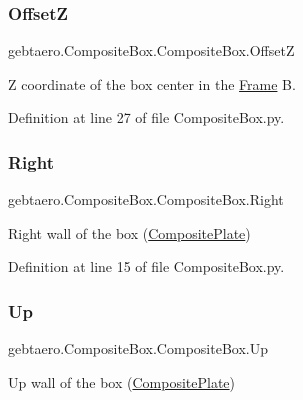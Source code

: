 \subsubsection{\texorpdfstring{OffsetZ}{OffsetZ}}
{\footnotesize\ttfamily gebtaero.\+Composite\+Box.\+Composite\+Box.\+OffsetZ}



Z coordinate of the box center in the \hyperlink{namespacegebtaero_1_1_frame}{Frame} B. 



Definition at line 27 of file Composite\+Box.\+py.

\mbox{\label{classgebtaero_1_1_composite_box_1_1_composite_box_a61cdca93cc1f5ef451192395fc50b67b}} 
\subsubsection{\texorpdfstring{Right}{Right}}
{\footnotesize\ttfamily gebtaero.\+Composite\+Box.\+Composite\+Box.\+Right}



Right wall of the box (\hyperlink{namespacegebtaero_1_1_composite_plate}{Composite\+Plate}) 



Definition at line 15 of file Composite\+Box.\+py.

\mbox{\label{classgebtaero_1_1_composite_box_1_1_composite_box_a4c043150a29d71b986a91f21be6a4e47}} 
\subsubsection{\texorpdfstring{Up}{Up}}
{\footnotesize\ttfamily gebtaero.\+Composite\+Box.\+Composite\+Box.\+Up}



Up wall of the box (\hyperlink{namespacegebtaero_1_1_composite_plate}{Composite\+Plate}) 



